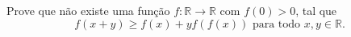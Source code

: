 Prove que não existe uma função \(f\colon  \mathbb{R} \to \mathbb{R}\) com \(f(0) >0\), tal que
\[f(x+y) \geq f(x) +yf(f(x)) \text{ para todo } x,y \in \mathbb{R}. \]
